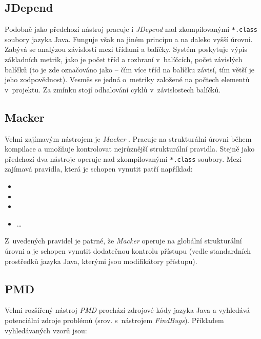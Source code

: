 \subsection{JDepend}
Podobně jako předchozí nástroj pracuje i \emph{JDepend} \cite{existingtools:jdepend} nad zkompilovanými \verb+*.class+ soubory jazyka Java. Funguje však na jiném principu a na daleko vyšší úrovni. Zabývá se analýzou závislostí mezi třídami a balíčky. Systém poskytuje výpis základních metrik, jako je počet tříd a rozhraní v~balíčcích, počet závislých balíčků (to je zde označováno jako  -- čím více tříd na balíčku závisí, tím větší je jeho zodpovědnost). Vesměs se jedná o~metriky založené na počtech elementů v~projektu. Za zmínku stojí odhalování cyklů v~závislostech balíčků.

\subsection{Macker}
Velmi zajímavým nástrojem je \emph{Macker} \cite{existingtools:macker}. Pracuje na strukturální úrovni během kompilace a umožňuje kontrolovat nejrůznější strukturální pravidla. Stejně jako předchozí dva nástroje operuje nad zkompilovanými \verb+*.class+ soubory. Mezi zajímavá pravidla, která je schopen vynutit patří například:

\begin{itemize}
\item {}
\item {}
\item {}
\item \ldots
\end{itemize}

Z~uvedených pravidel je patrné, že \emph{Macker} operuje na globální strukturální úrovni a je schopen vynutit dodatečnou kontrolu přístupu (vedle standardních prostředků jazyka Java, kterými jsou modifikátory přístupu).

\subsection{PMD}
Velmi rozšířený nástroj \emph{PMD} \cite{existingtools:pmd} prochází zdrojové kódy jazyka Java a vyhledává potenciální zdroje problémů (srov. s~nástrojem \emph{FindBugs}). Příkladem vyhledávaných vzorů jsou:

